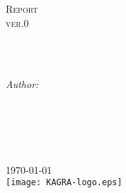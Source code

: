 \documentclass[
10pt, %
english, %
singlespacing, %
nohyperref, %
headsepline, %
]{MastersDoctoralThesis} %
\author{Y. \textsc{Inoue}, Y.-K. Chu, S. Haino, B. H. Hsieh, N. Kanda, T.Shishido, T. Tomaru, T. Yamamoto, and T. Yokozawa\\
on the behalf of Calibration sub-group}
\begin{document}
\frontmatter %

\pagestyle{plain} %


\begin{titlepage}
\begin{center}

\vspace*{.06\textheight}
{\scshape\LARGE \univname\par}\vspace{1.5cm} %
\textsc{\Large Report \\ ver.0}\\[0.5cm] %

\HRule \\[0.4cm] %
{\huge \bfseries \ttitle\par}\vspace{0.4cm} %
\HRule \\[1.5cm] %
 
\begin{minipage}[t]{0.8\textwidth}
\begin{flushleft} \large
\emph{Author:}\\
{\authorname} %
\end{flushleft}
\end{minipage}
\begin{minipage}[t]{0.4\textwidth}
\begin{flushright} \large
\end{flushright}
\end{minipage}\\[3cm]
 
\vfill

\groupname\\\deptname\\[2cm] %
 
\vfill

{\large \today}\\[1cm] %
\texttt{[image: KAGRA-logo.eps]}
 
\vfill
\end{center}
\end{titlepage}
\end{document}
